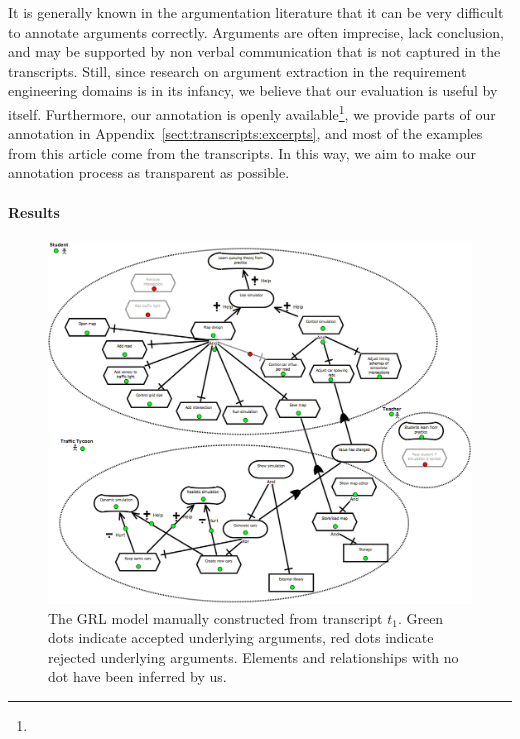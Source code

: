 It is generally known in the argumentation literature that it can be very difficult to annotate arguments correctly. Arguments are often imprecise, lack conclusion, and may be supported by non verbal communication that is not captured in the transcripts. Still, since research on argument extraction in the requirement engineering domains is in its infancy, we believe that our evaluation is useful by itself. Furthermore, our annotation is openly available\footnote{}, we provide parts of our annotation in Appendix~\ref{sect:transcripts:excerpts}, and most of the examples from this article come from the transcripts. In this way, we aim to make our annotation process as transparent as possible.

\paragraph{Results}

\begin{figure}[h]
\includegraphics[width=\textwidth]{img/transcript_grl}
\caption{The GRL model manually constructed from transcript $t_1$. Green dots indicate accepted underlying arguments, red dots indicate rejected underlying arguments. Elements and relationships with no dot have been inferred by us.}
\label{fig:transcripts:grl}
\end{figure}


